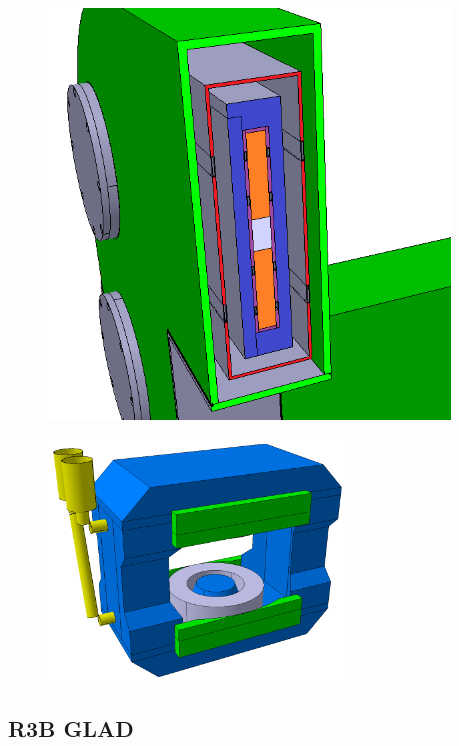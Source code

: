 \begin{figure}[H]
\begin{minipage}[b]{0.495\textwidth}
\includegraphics[width=0.95\textwidth]{pictures/Old_magnet_coils.png}
\caption{}
\label{fig:OldCbmMagnet2}
\end{minipage}
\end{figure}

\begin{figure}[H]
\centering
\includegraphics[width=0.7\textwidth]{pictures/New_CBM_magnet.png}
\caption{}
\label{fig:NewCbmMagnet1}
\end{figure}


\subsection{R3B GLAD}\label{sec:secGlad}

